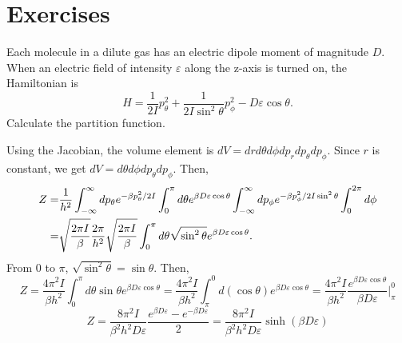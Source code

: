 \section{Exercises}
    \begin{eocproblem*}{}{Each molecule in a dilute gas has an electric dipole moment of magnitude $D$. When an electric field of intensity $\varepsilon$ along the z-axis is turned on, the Hamiltonian is \begin{equation}
        H = \frac{1}{2I}p_\theta^2+\frac{1}{2I\sin^2\theta}p_\phi^2-D\varepsilon\cos\theta.
    \end{equation}
    Calculate the partition function.}
\end{eocproblem*}
        Using the Jacobian, the volume element is $dV = drd\theta d\phi dp_rdp_\theta dp_\phi$. Since $r$ is constant, we get $dV=d\theta d\phi dp_\theta dp_\phi$. Then,
        \begin{align}
            Z =& \frac{1}{h^2}\int_{-\infty}^\infty dp_\theta e^{-\beta p_\theta^2/2I}\int_0^\pi d\theta e^{\beta D\varepsilon\cos\theta}\int_{-\infty}^\infty dp_\phi e^{-\beta p_\phi^2/2I\sin^2\theta}\int_0^{2\pi} d\phi \notag\\
            =& \sqrt{\frac{2\pi I}{\beta}}\frac{2\pi}{h^2}\sqrt{\frac{2\pi I}{\beta}}\int_0^\pi d\theta \sqrt{\sin^2\theta}e^{\beta D\varepsilon\cos\theta}.
        \end{align}
        From $0$ to $\pi$, $\sqrt{\sin^2\theta}=\sin\theta$. Then,
        \begin{equation}
            Z = \frac{4\pi^2I}{\beta h^2}\int_0^\pi d\theta \sin\theta e^{\beta D\varepsilon \cos\theta} = \frac{4\pi^2I}{\beta h^2} \int_\pi^0d(\cos\theta)e^{\beta D\varepsilon\cos\theta} = \frac{4\pi^2I}{\beta h^2} \frac{e^{\beta D\varepsilon \cos\theta}}{\beta D \varepsilon}\bigg\vert_\pi^0
        \end{equation}
        \begin{equation}
            Z = \frac{8\pi^2I}{\beta^2h^2D\varepsilon}\frac{e^{\beta D\varepsilon}-e^{-\beta D\varepsilon}}{2} = \frac{8\pi^2I}{\beta^2h^2D\varepsilon}\sinh(\beta D\varepsilon)
        \end{equation}


